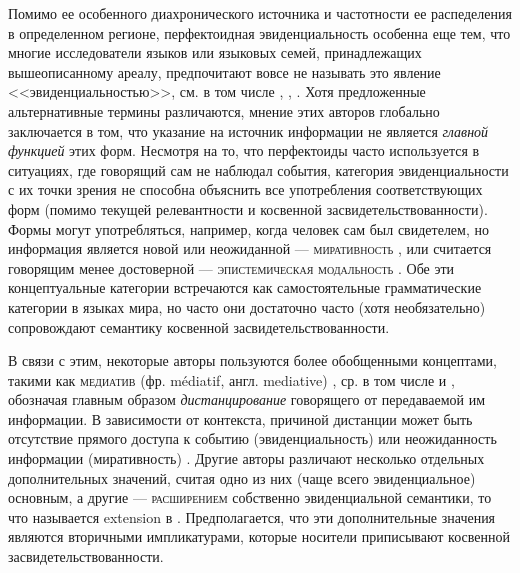 \par Помимо ее особенного диахронического источника и частотности ее распеделения в определенном регионе, перфектоидная эвиденциальность особенна еще тем, что многие исследователи языков или языковых семей, принадлежащих вышеописанному ареалу, предпочитают вовсе не называть это явление <<эвиденциальностью>>, см. в том числе \citep{johanson2000}, \citep{friedman2000}, \citep{lazard1999}. Хотя предложенные альтернативные термины различаются, мнение этих авторов глобально заключается в том, что указание на источник информации не является \textit{главной функцией} этих форм. Несмотря на то, что перфектоиды часто используется в ситуациях, где говорящий сам не наблюдал события, категория эвиденциальности с их точки зрения не способна объяснить все употребления соответствующих форм (помимо текущей релевантности и косвенной засвидетельствованности). Формы могут употребляться, например, когда человек сам был свидетелем, но информация является новой или неожиданной --- \textsc{миративность} \citep[36]{delancey1997}, или считается говорящим менее достоверной --- \textsc{эпистемическая модальность} \citep[1--6]{boye2012}. Обе эти концептуальные категории встречаются как самостоятельные грамматические категории в языках мира, но часто они достаточно часто (хотя необязательно) сопровождают семантику косвенной засвидетельствованности.
\par В связи с этим, некоторые авторы пользуются более обобщенными концептами, такими как \textsc{медиатив} (фр. médiatif, англ. mediative) , ср. в том числе \citep{lazard1956} и \citep{lazard1999}, обозначая главным образом \textit{дистанцирование} говорящего от передаваемой им информации. В зависимости от контекста, причиной дистанции может быть отсутствие прямого доступа к событию (эвиденциальность) или неожиданность информации (миративность) \citep[95]{lazard1999}. Другие авторы различают несколько отдельных дополнительных значений, считая одно из них (чаще всего эвиденциальное) основным, а другие --- \textsc{расширением} собственно эвиденциальной семантики, то что называется extension в \citep{aikhenvald2004}. Предполагается, что эти дополнительные значения являются вторичными импликатурами, которые носители приписывают косвенной засвидетельствованности.

